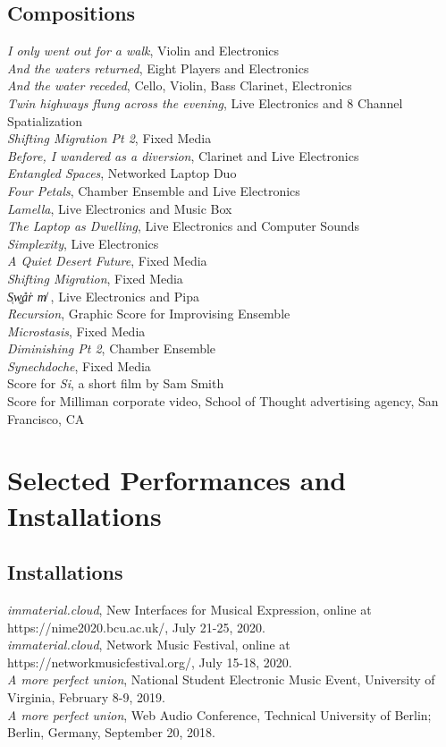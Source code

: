 \documentclass[10pt, a4paper]{article}
\newcommand{\years}[1]{\marginnote{\scriptsize #1}}
\begin{document}
\subsection*{Compositions}
\years{2017}
\textit{I only went out for a walk}, Violin and Electronics\\
\textit{And the waters returned}, Eight Players and Electronics \\
\textit{And the water receded}, Cello, Violin, Bass Clarinet, Electronics \\
\years{2016} 
\textit{Twin highways flung across the evening}, Live Electronics and 8 Channel Spatialization \\
\textit{Shifting Migration Pt 2}, Fixed Media \\
\textit{Before, I wandered as a diversion}, Clarinet and Live Electronics\\
\textit{Entangled Spaces}, Networked Laptop Duo \\
\textit{Four Petals}, Chamber Ensemble and Live Electronics\\
\textit{Lamella}, Live Electronics and Music Box\\
\textit{The Laptop as Dwelling}, Live Electronics and Computer Sounds\\
\textit{Simplexity}, Live Electronics \\
\textit{A Quiet Desert Future}, Fixed Media\\
\textit{Shifting Migration}, Fixed Media \\
\years{2015}
\textit{S̜w͚a̎r̍  m̸}  , Live Electronics and Pipa\\  
\textit{Recursion}, Graphic Score for Improvising Ensemble \\  
\textit{Microstasis}, Fixed Media\\  
\textit{Diminishing Pt 2}, Chamber Ensemble \\  
\textit{Synechdoche}, Fixed Media \\  
Score for \textit{Si}, a short film by Sam Smith\\  
Score for Milliman corporate video, School of Thought advertising agency, San Francisco, CA\\  

\section*{Selected Performances and Installations}

\subsection*{Installations}
\years{2020}\textit{immaterial.cloud}, New Interfaces for Musical Expression, online at https://nime2020.bcu.ac.uk/, July 21-25, 2020. \\
\textit{immaterial.cloud}, Network Music Festival, online at https://networkmusicfestival.org/, July 15-18, 2020.\\
\years{2019} \textit{A more perfect union}, National Student Electronic Music Event, University of Virginia, February 8-9, 2019.\\
\years{2018} \textit{A more perfect union}, Web Audio Conference, Technical University of Berlin; Berlin, Germany, September 20, 2018.
\end{document}
